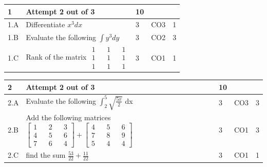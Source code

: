 \documentclass[12pt]{article}
\begin{document}
	\begin{longtable}{|L{1cm}|L{8cm}|C{1cm}|C{1cm}|C{1cm}|}\hline
			\bf1 & \bf{Attempt} \bf2 out of \bf3 & \bf10 & & \\ \hline
				1.A &
	Differentiate $x^{3}dx$ \newline
		 &  3 & CO3 & 1\\ \hline
		1.B &
	Evaluate the following $\int y^{3} dy$ \newline
		 &  3 & CO2 & 3\\ \hline
		1.C &
	Rank of the matrix  $\begin{matrix} 1 && 1 &&1 \\ 1 && 1 && 1\\ 1 && 1 && 1 \end{matrix}$ \newline
		 &  3 & CO1 & 1\\ \hline
		\end{longtable}

	
	


	
	
		

	
	
	\begin{longtable}{|L{1cm}|L{8cm}|C{1cm}|C{1cm}|C{1cm}|}\hline
			\bf2 & \bf{Attempt} \bf2 out of \bf3 & \bf10 & & \\ \hline
				2.A &
	Evaluate the following $\int_{2}^{5}\sqrt{\frac{5x}{2}}$ dx \newline
		 &  3 & CO3 & 3\\ \hline
		2.B &
	Add the following matrices $\begin{bmatrix} 1 && 2 && 3\\ 4 && 5 && 6\\ 7 && 6 && 4 \end{bmatrix}+\begin{bmatrix} 4 && 5 && 6\\ 7 && 8 && 9 \\ 5 && 4 && 4 \end{bmatrix}$ \newline
		 &  3 & CO1 & 3\\ \hline
		2.C &
	find the sum $\frac{53}{22}+\frac{11}{22}$ \newline
		 &  3 & CO1 & 1\\ \hline
		\end{longtable}

	
	


	
	
\end{document}

